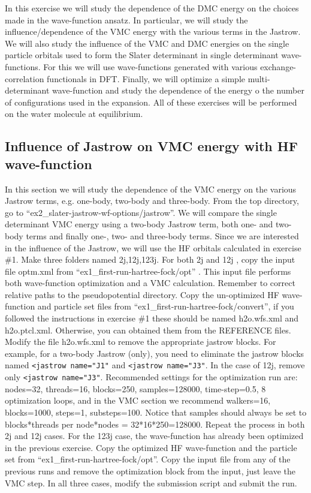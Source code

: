 In this exercise we will study the dependence of the DMC energy on the choices made
in the wave-function ansatz. In particular, we will study the influence/dependence of the
VMC energy with the various terms in the Jastrow. We will also study the influence of
the VMC and DMC energies on the single particle orbitals used to form the Slater determinant 
in single determinant wave-functions. For this we will use wave-functions generated
with various exchange-correlation functionals in DFT. Finally, we will optimize a simple
multi-determinant wave-function and study the dependence of the energy o the number of
configurations used in the expansion. All of these exercises will be performed on the water 
molecule at equilibrium.


\subsection{Influence of Jastrow on VMC energy with HF wave-function}
In this section we will study the dependence of the VMC energy on the various Jastrow
terms, e.g. one-body, two-body and three-body. From the top directory, go to ``ex2\_slater-jastrow-wf-options/jastrow''. 
We will compare the single determinant VMC energy using a two-body 
Jastrow term, both one- and two-body terms and finally one-, two- and three-body
terms. Since we are interested in the influence of the Jastrow, we will use the HF orbitals
calculated in exercise \#1. Make three folders named 2j,12j,123j. For both 2j and
12j %
, copy the input file optm.xml %
from ``ex1\_first-run-hartree-fock/opt'' . This input file performs both wave-function optimization 
and a VMC calculation. Remember to correct relative paths to the pseudopotential directory. Copy the un-optimized HF wave-function and particle set files
from ``ex1\_first-run-hartree-fock/convert'', if you followed the instructions in exercise \#1 these should be
named h2o.wfs.xml and h2o.ptcl.xml. Otherwise, you can obtained them from the
REFERENCE files. Modify the file h2o.wfs.xml to remove the appropriate jastrow
blocks. For example, for a two-body Jastrow (only), you need to eliminate the jastrow
blocks named \texttt{<jastrow name="J1"} and \texttt{<jastrow name="J3"}. In the case of 12j, remove
only \texttt{<jastrow name="J3"}. Recommended settings for the optimization run are: nodes=32,
threads=16, blocks=250, samples=128000, time-step=0.5, 8 optimization loops, and in the
VMC section we recommend walkers=16, blocks=1000, steps=1, substeps=100. Notice that
samples should always be set to blocks*threads per node*nodes = 32*16*250=128000. Repeat 
the process in both 2j and 12j cases. For the 123j case, the wave-function has
already been optimized in the previous exercise. Copy the optimized HF wave-function and
the particle set from ``ex1\_first-run-hartree-fock/opt''. Copy the input file from any of the previous runs and remove the optimization block from the
input, just leave the VMC step. In all three cases, modify the submission script and submit the run.

